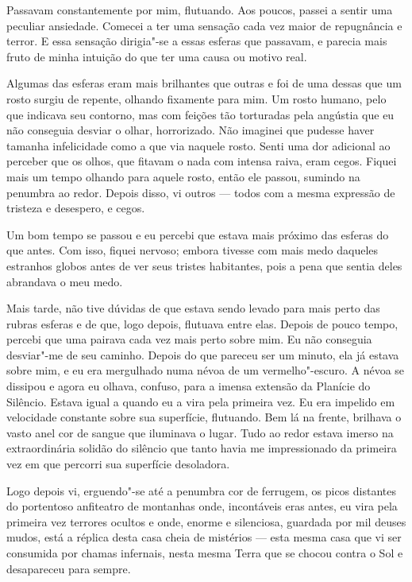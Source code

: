 Passavam constantemente por mim, flutuando. Aos poucos, passei a sentir uma peculiar ansiedade. Comecei a ter uma
sensação cada vez maior de repugnância e terror. E essa sensação dirigia"-se a essas esferas que passavam, e parecia
mais fruto de minha intuição do que ter uma causa ou motivo real.

Algumas das esferas eram mais brilhantes que outras e foi de uma dessas que um rosto surgiu de repente, olhando
fixamente para mim. Um rosto humano, pelo que indicava seu contorno, mas com feições tão torturadas pela angústia que
eu não conseguia desviar o olhar, horrorizado. Não imaginei que pudesse haver tamanha infelicidade como a que via
naquele rosto. Senti uma dor adicional ao perceber que os olhos, que fitavam o nada com intensa raiva, eram cegos.
Fiquei mais um tempo olhando para aquele rosto, então ele passou, sumindo na penumbra ao redor. Depois disso, vi
outros --- todos com a mesma expressão de tristeza e desespero, e cegos. 

Um bom tempo se passou e eu percebi que estava mais próximo das esferas do que antes. Com isso, fiquei nervoso; embora
tivesse com mais medo daqueles estranhos globos antes de ver seus tristes habitantes, pois a pena que sentia deles
abrandava o meu medo.

Mais tarde, não tive dúvidas de que estava sendo levado para mais perto das rubras esferas e de que, logo depois,
flutuava entre elas. Depois de pouco tempo, percebi que uma pairava cada vez mais perto sobre mim. Eu não conseguia
desviar"-me de seu caminho. Depois do que pareceu ser um minuto, ela já estava sobre mim, e eu era mergulhado numa névoa
de um vermelho"-escuro. A névoa se dissipou e agora eu olhava, confuso, para a imensa extensão da Planície do Silêncio.
Estava igual a quando eu a vira pela primeira vez. Eu era impelido em velocidade constante sobre sua superfície,
flutuando. Bem lá na frente, brilhava o vasto anel cor de sangue que iluminava o lugar. Tudo ao redor estava imerso
na extraordinária solidão do silêncio que tanto havia me impressionado da primeira vez em que percorri sua superfície
desoladora.

Logo depois vi, erguendo"-se até a penumbra cor de ferrugem, os picos distantes do portentoso anfiteatro de montanhas
onde, incontáveis eras antes, eu vira pela primeira vez terrores ocultos e onde, enorme e silenciosa, guardada por mil
deuses mudos, está a réplica desta casa cheia de mistérios --- esta mesma casa que vi ser consumida por chamas infernais,
nesta mesma Terra que se chocou contra o Sol e desapareceu para sempre. 

